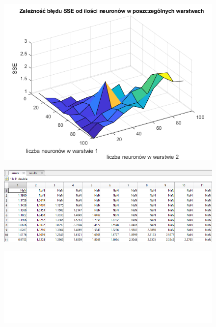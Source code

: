 \documentclass[a4paper, 12pt]{report}
\begin{document}
\begin{figure}[hbt!]
\includegraphics[width=14cm]{lr3 sse}
\centering
\end{figure}

\begin{figure}[hbt!]
\includegraphics[width=14cm]{lr3 sse dane}
\centering
\end{figure}

\begin{figure}[hbt!]
\includegraphics[width=22cm]{puste}
\centering
\end{figure}
  

\newpage
\end{document}
